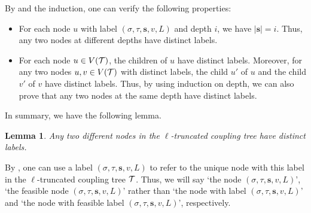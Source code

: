 \documentclass[11pt]{article}
\newtheorem{lemma}[theorem]{Lemma}
\newcommand{\abs}[1]{\left\vert#1\right\vert}
\newcommand{\set}[1]{\left\{#1\right\}}
\renewcommand{\mid}{\;\middle\vert\;} \newcommand{\cmid}{\,:\,}
\def\!#1{\mathtt{#1}}
\newcommand{\seqS}{\boldsymbol{s}}
\newcommand{\qtodo}[1]{\todo[color = purple!40, size = \tiny]{\textbf{guoliang:} #1}}
\newcommand{\qgl}[1]{{\color{purple}{#1}}}
\newcommand{\hktodo}[1]{{\color{blue}{#1}}}
\begin{document}




By  and the induction, one can verify the following properties:
\begin{itemize}
\item For each node $u$ with label $(\sigma,\tau,\seqS,v,L)$ and depth $i$, we have $\abs{\seqS} = i$.
Thus, any two nodes at different depths have distinct labels.
\item For each node $u\in V(\mathcal{T})$, the children of $u$ have distinct labels. Moreover, for any two nodes $u,v\in V(\mathcal{T})$ with distinct labels, the child $u'$ of $u$ and the child $v'$ of $v$ have distinct labels.
Thus, by using induction on depth, we can also prove that any two nodes at the same depth have distinct labels.
\end{itemize}
In summary, we have the following lemma.
\begin{lemma}\label{lemma-truncated-coupling-tree}
Any two different nodes in the $\ell$-truncated coupling tree have distinct labels.
\end{lemma}

By , one can use a label $(\sigma, \tau, \seqS, v, L)$ to refer to the unique node with this label in the $\ell$-truncated coupling tree $\mathcal{T}$. 
Thus, we will say `the node $(\sigma, \tau, \seqS, v, L)$', `the feasible node $(\sigma, \tau, \seqS, v, L)$' rather than `the node with label $(\sigma, \tau, \seqS, v, L)$' and `the node with feasible label $(\sigma, \tau, \seqS, v, L)$', respectively.
\end{document}
